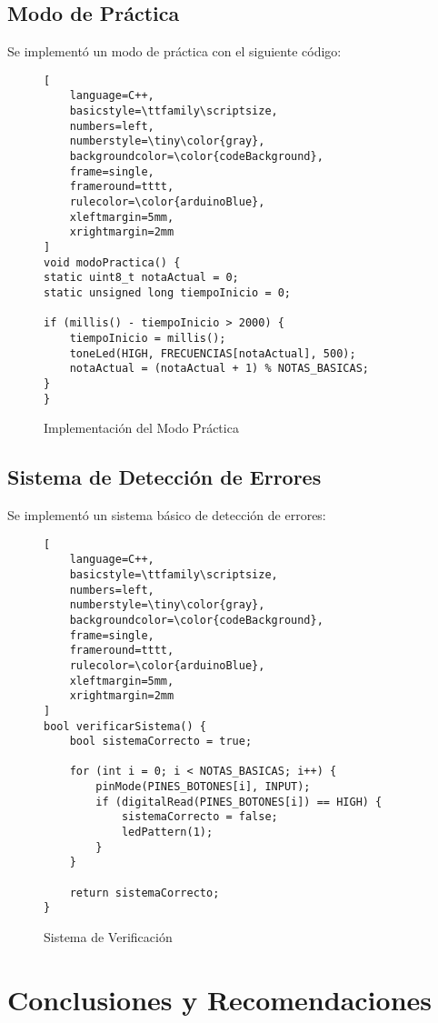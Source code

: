\subsection{Modo de Práctica}
Se implementó un modo de práctica con el siguiente código:

\begin{figure}[H]
\centering
\begin{lstlisting}[
	language=C++,
	basicstyle=\ttfamily\scriptsize,
	numbers=left,
	numberstyle=\tiny\color{gray},
	backgroundcolor=\color{codeBackground},
	frame=single,
	frameround=tttt,
	rulecolor=\color{arduinoBlue},
	xleftmargin=5mm,
	xrightmargin=2mm
]
void modoPractica() {
static uint8_t notaActual = 0;
static unsigned long tiempoInicio = 0;

if (millis() - tiempoInicio > 2000) {
	tiempoInicio = millis();
	toneLed(HIGH, FRECUENCIAS[notaActual], 500);
	notaActual = (notaActual + 1) % NOTAS_BASICAS;
}
}
\end{lstlisting}
\caption{Implementación del Modo Práctica}
\label{fig:practice-mode}
\end{figure}

\subsection{Sistema de Detección de Errores}
Se implementó un sistema básico de detección de errores:

\begin{figure}[H]
\centering
\begin{lstlisting}[
	language=C++,
	basicstyle=\ttfamily\scriptsize,
	numbers=left,
	numberstyle=\tiny\color{gray},
	backgroundcolor=\color{codeBackground},
	frame=single,
	frameround=tttt,
	rulecolor=\color{arduinoBlue},
	xleftmargin=5mm,
	xrightmargin=2mm
]
bool verificarSistema() {
	bool sistemaCorrecto = true;
	
	for (int i = 0; i < NOTAS_BASICAS; i++) {
		pinMode(PINES_BOTONES[i], INPUT);
		if (digitalRead(PINES_BOTONES[i]) == HIGH) {
			sistemaCorrecto = false;
			ledPattern(1);
		}
	}
	
	return sistemaCorrecto;
}
\end{lstlisting}
\caption{Sistema de Verificación}
\label{fig:error-detection}
\end{figure}

\section{Conclusiones y Recomendaciones}

